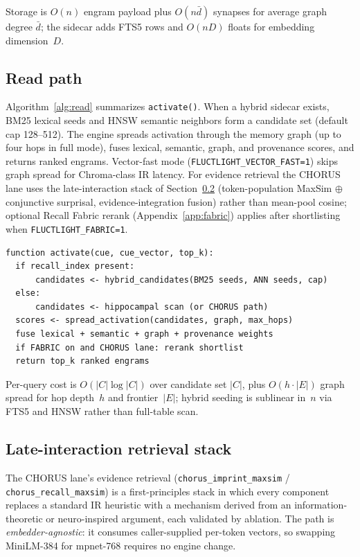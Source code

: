 \documentclass[11pt]{article}
\begin{document}
Storage is $O(n)$ engram payload plus $O(n \bar{d})$ synapses for average graph degree
$\bar{d}$; the sidecar adds FTS5 rows and $O(nD)$ floats for embedding dimension~$D$.

\subsection{Read path}
Algorithm~\ref{alg:read} summarizes \texttt{activate()}. When a hybrid sidecar exists,
BM25 lexical seeds and HNSW semantic neighbors form a candidate set (default cap
128--512). The engine spreads activation through the memory graph (up to four hops in
full mode), fuses lexical, semantic, graph, and provenance scores, and returns ranked
engrams. Vector-fast mode (\texttt{FLUCTLIGHT\_VECTOR\_FAST=1}) skips graph spread for
Chroma-class IR latency. For evidence retrieval the CHORUS lane uses the
late-interaction stack of Section~\ref{sec:maxsim} (token-population MaxSim
$\oplus$ conjunctive surprisal, evidence-integration fusion) rather than
mean-pool cosine; optional Recall Fabric rerank (Appendix~\ref{app:fabric})
applies after shortlisting when \texttt{FLUCTLIGHT\_FABRIC=1}.

\begin{lstlisting}[caption={Read path (\texttt{activate}).},label={alg:read}]
function activate(cue, cue_vector, top_k):
  if recall_index present:
      candidates <- hybrid_candidates(BM25 seeds, ANN seeds, cap)
  else:
      candidates <- hippocampal scan (or CHORUS path)
  scores <- spread_activation(candidates, graph, max_hops)
  fuse lexical + semantic + graph + provenance weights
  if FABRIC on and CHORUS lane: rerank shortlist
  return top_k ranked engrams
\end{lstlisting}

Per-query cost is $O(|C| \log |C|)$ over candidate set $|C|$, plus $O(h \cdot |E|)$
graph spread for hop depth~$h$ and frontier~$|E|$; hybrid seeding is sublinear in~$n$
via FTS5 and HNSW rather than full-table scan.

\subsection{Late-interaction retrieval stack}
\label{sec:maxsim}
The CHORUS lane's evidence retrieval (\texttt{chorus\_imprint\_maxsim} /
\texttt{chorus\_recall\_maxsim}) is a first-principles stack in which every
component replaces a standard IR heuristic with a mechanism derived from an
information-theoretic or neuro-inspired argument, each validated by ablation. The
path is \emph{embedder-agnostic}: it consumes caller-supplied per-token vectors,
so swapping MiniLM-384 for mpnet-768 requires no engine change.
\end{document}
